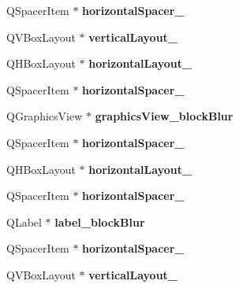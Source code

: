 \begin{DoxyCompactItemize}
Q\+Spacer\+Item $\ast$ {\bfseries horizontal\+Spacer\+\_}
\item 
\mbox{\label{class_ui___main_window_aef92416fd119b0c0349ff2b58754f968}} 
Q\+V\+Box\+Layout $\ast$ {\bfseries vertical\+Layout\+\_}
\item 
\mbox{\label{class_ui___main_window_a683a8bf72fc53fccc1e26a811a89095b}} 
Q\+H\+Box\+Layout $\ast$ {\bfseries horizontal\+Layout\+\_}
\item 
\mbox{\label{class_ui___main_window_abda5a6d186c288668b4cc00732eb158e}} 
Q\+Spacer\+Item $\ast$ {\bfseries horizontal\+Spacer\+\_}
\item 
\mbox{\label{class_ui___main_window_a7832a97a03ee6f5c600a3dfe4c1ba2d9}} 
Q\+Graphics\+View $\ast$ {\bfseries graphics\+View\+\_\+block\+Blur}
\item 
\mbox{\label{class_ui___main_window_ad9d9bc0bd716858f45e1ea9b6c24d368}} 
Q\+Spacer\+Item $\ast$ {\bfseries horizontal\+Spacer\+\_}
\item 
\mbox{\label{class_ui___main_window_aad6ee010f1f381e74d982e42b7bc32c9}} 
Q\+H\+Box\+Layout $\ast$ {\bfseries horizontal\+Layout\+\_}
\item 
\mbox{\label{class_ui___main_window_a0aaee1ce44c28028a2700a7545207e0f}} 
Q\+Spacer\+Item $\ast$ {\bfseries horizontal\+Spacer\+\_}
\item 
\mbox{\label{class_ui___main_window_abe27c2c813ca24688d0ed833a32cdbfb}} 
Q\+Label $\ast$ {\bfseries label\+\_\+block\+Blur}
\item 
\mbox{\label{class_ui___main_window_a9f4fdedd7b0225e858be3636a990216e}} 
Q\+Spacer\+Item $\ast$ {\bfseries horizontal\+Spacer\+\_}
\item 
\mbox{\label{class_ui___main_window_af84b12f5b89f4faa5a42c15400b9592b}} 
Q\+V\+Box\+Layout $\ast$ {\bfseries vertical\+Layout\+\_}
\item 

\end{DoxyCompactItemize}
